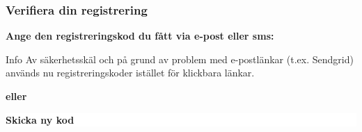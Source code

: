 \documentclass[10pt]{beamer}
\begin{document}
\begin{frame}[label=verify]
  \frametitle{Verifiera din registrering}

  \vspace{0.5cm}
  \begin{minipage}{0.9\textwidth}
    \small
    \textbf{Ange den registreringskod du fått via e-post eller sms:} \underline{\hspace{5cm}} \\

    \vspace{0.8cm}
    \begin{block}{Info}
      Av säkerhetsskäl och på grund av problem med e-postlänkar (t.ex. Sendgrid) används nu registreringskoder istället för klickbara länkar.
    \end{block}

    \vspace{1.2cm}
    \centering
    
    \vspace{1.2cm}
    \textcolor{warmbrown}{\textbf{eller}}
    
    \vspace{0.6cm}
    \colorbox{white}{%
      \parbox{5cm}{\centering\footnotesize\textbf{Skicka ny kod}}%
    }
  \end{minipage}
\end{frame}

\end{document}
